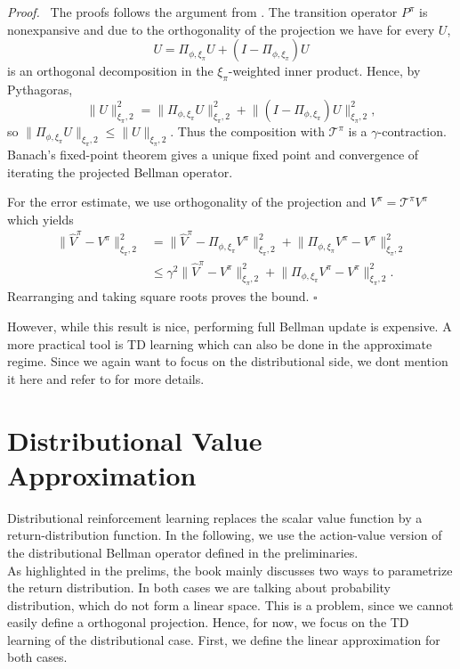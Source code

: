 \documentclass[12pt]{article}
\newcommand*{\QED}{\hfill\ensuremath{\square}}
\newenvironment{proof}{\par\smallskip\noindent\textit{Proof.}\ }{\QED\par\smallskip}
\newcommand{\1}{\mathds{1}}
\newcommand{\T}{\mathcal{T}}
\newcommand{\norm}[1]{\lVert #1 \rVert}
\begin{document}
\begin{proof}
The proofs follows the argument from \cite[Theorem 9.8]{bellemare2023distributional}.
The transition operator $P^\pi$ is nonexpansive and due to the orthogonality of the projection we have for every $U$,
$$
  U=\Pi_{\phi,\xi_\pi}U+(I-\Pi_{\phi,\xi_\pi})U
$$
is an orthogonal decomposition in the $\xi_\pi$-weighted inner product. Hence,
by Pythagoras,
$$
  \norm{U}_{\xi_\pi,2}^2
  =\norm{\Pi_{\phi,\xi_\pi}U}_{\xi_\pi,2}^2
   +\norm{(I-\Pi_{\phi,\xi_\pi})U}_{\xi_\pi,2}^2,
$$
so $\norm{\Pi_{\phi,\xi_\pi}U}_{\xi_\pi,2}\leq
\norm{U}_{\xi_\pi,2}$. Thus the composition with $\T^\pi$ is a
$\gamma$-contraction. Banach's fixed-point
theorem gives a unique fixed point and convergence of iterating the projected Bellman operator. 

For the error estimate, we use orthogonality of the projection and
$V^\pi=\T^\pi V^\pi$ which yields
$$
\begin{aligned}
 \norm{\widehat V^\pi-V^\pi}_{\xi_\pi,2}^2
 &=\norm{\widehat V^\pi-\Pi_{\phi,\xi_\pi}V^\pi}_{\xi_\pi,2}^2
   +\norm{\Pi_{\phi,\xi_\pi}V^\pi-V^\pi}_{\xi_\pi,2}^2\\
 &\leq\gamma^2\norm{\widehat V^\pi-V^\pi}_{\xi_\pi,2}^2
   +\norm{\Pi_{\phi,\xi_\pi}V^\pi-V^\pi}_{\xi_\pi,2}^2.
\end{aligned}
$$
Rearranging and taking square roots proves the bound.
\end{proof}

However, while this result is nice, performing full Bellman update is expensive. A more practical tool is TD learning which can also be done in the approximate regime.
Since we again want to focus on the distributional side, we dont mention it here and refer to \cite[Chapter 9.4]{bellemare2023distributional} for more details. 

\section{Distributional Value Approximation}

Distributional reinforcement learning replaces the scalar value function by a
return-distribution function. In the following, we use the action-value version of the distributional Bellman
operator defined in the preliminaries. \\

As highlighted in the prelims, the book mainly discusses two ways to parametrize the return distribution.
In both cases we are talking about probability distribution, which do not form a linear space. This is a problem, since we cannot easily define a orthogonal projection.
Hence, for now, we focus on the TD learning of the distributional case. First, we define the linear approximation for both cases.  \\
\end{document}
